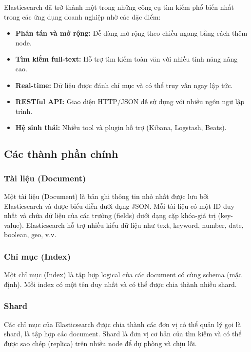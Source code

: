 \documentclass[../BTL.tex]{subfiles}
\begin{document}
Elasticsearch đã trở thành một trong những công cụ tìm kiếm phổ biến nhất trong các ứng dụng doanh nghiệp nhờ các đặc điểm:
\begin{itemize}
    \item \textbf{Phân tán và mở rộng:} Dễ dàng mở rộng theo chiều ngang bằng cách thêm node.
    
    \item \textbf{Tìm kiếm full-text:} Hỗ trợ tìm kiếm toàn văn với nhiều tính năng nâng cao.
    
    \item \textbf{Real-time:} Dữ liệu được đánh chỉ mục và có thể truy vấn ngay lập tức.
    
    \item \textbf{RESTful API:} Giao diện HTTP/JSON dễ sử dụng với nhiều ngôn ngữ lập trình.
    
    \item \textbf{Hệ sinh thái:} Nhiều tool và plugin hỗ trợ (Kibana, Logstash, Beats).
\end{itemize}

\subsection{Các thành phần chính}

\subsubsection{Tài liệu (Document)}
Một tài liệu (Document) là bản ghi thông tin nhỏ nhất được lưu bởi Elasticsearch và được biểu diễn dưới dạng JSON. Mỗi tài liệu có một ID duy nhất và chứa dữ liệu của các trường (fields) dưới dạng cặp khóa-giá trị (key-value). Elasticsearch hỗ trợ nhiều kiểu dữ liệu như text, keyword, number, date, boolean, geo, v.v.

\subsubsection{Chỉ mục (Index)}
Một chỉ mục (Index) là tập hợp logical của các document có cùng schema (mặc định). Mỗi index có một tên duy nhất và có thể được chia thành nhiều shard.

\subsubsection{Shard}
Các chỉ mục của Elasticsearch được chia thành các đơn vị có thể quản lý gọi là shard, là tập hợp các document. Shard là đơn vị cơ bản của tìm kiếm và có thể được sao chép (replica) trên nhiều node để dự phòng và chịu lỗi.
\end{document}
